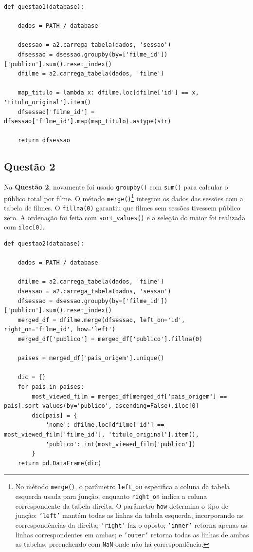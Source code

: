 \documentclass{article}
\begin{document}
\linespread{1}
\begin{lstlisting}
def questao1(database):
    
    dados = PATH / database

    dsessao = a2.carrega_tabela(dados, 'sessao')
    dfsessao = dsessao.groupby(by=['filme_id'])['publico'].sum().reset_index() 
    dfilme = a2.carrega_tabela(dados, 'filme')
    
    map_titulo = lambda x: dfilme.loc[dfilme['id'] == x, 'titulo_original'].item() 
    dfsessao['filme_id'] =  dfsessao['filme_id'].map(map_titulo).astype(str)
    
    return dfsessao
\end{lstlisting}
\linespread{1.5}
\subsection*{Questão 2}
Na \textbf{Questão 2}, novamente foi usado \texttt{groupby()} com \texttt{sum()} para calcular o público total por filme. O método \texttt{merge()}\footnote{No método \texttt{merge()}, o parâmetro \texttt{left\_on} especifica a coluna da tabela esquerda usada para junção, enquanto \texttt{right\_on} indica a coluna correspondente da tabela direita. O parâmetro \texttt{how} determina o tipo de junção: \texttt{'left'} mantém todas as linhas da tabela esquerda, incorporando as correspondências da direita; \texttt{'right'} faz o oposto; \texttt{'inner'} retorna apenas as linhas correspondentes em ambas; e \texttt{'outer'} retorna todas as linhas de ambas as tabelas, preenchendo com \texttt{NaN} onde não há correspondência.} integrou os dados das sessões com a tabela de filmes. O \texttt{fillna(0)} garantiu que filmes sem sessões tivessem público zero. A ordenação foi feita com \texttt{sort\_values()} e a seleção do maior foi realizada com \texttt{iloc[0]}.
\linespread{1}
\begin{lstlisting}
def questao2(database):

    dados = PATH / database

    dfilme = a2.carrega_tabela(dados, 'filme')
    dsessao = a2.carrega_tabela(dados, 'sessao')
    dfsessao = dsessao.groupby(by=['filme_id'])['publico'].sum().reset_index()
    merged_df = dfilme.merge(dfsessao, left_on='id', right_on='filme_id', how='left')
    merged_df['publico'] = merged_df['publico'].fillna(0)
    
    paises = merged_df['pais_origem'].unique()
    
    dic = {}
    for pais in paises:        
        most_viewed_film = merged_df[merged_df['pais_origem'] == pais].sort_values(by='publico', ascending=False).iloc[0]
        dic[pais] = {
            'nome': dfilme.loc[dfilme['id'] == most_viewed_film['filme_id'], 'titulo_original'].item(),
            'publico': int(most_viewed_film['publico'])
        }
    return pd.DataFrame(dic) 
\end{lstlisting}
\end{document}
